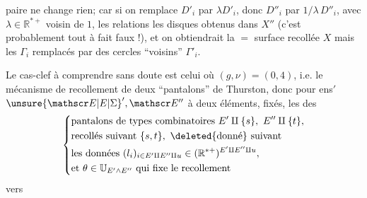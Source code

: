 paire ne change rien; car si on remplace $D'_i$ par $\lambda D'_i$, donc $D''_i$ par $1/\lambda\,D''_i$, avec $\lambda\in\mathbb R^{*+}$ voisin de $1$, les  relations   les disques obtenus dans  $X''$ (c'est probablement tout à fait faux !), et on obtiendrait la $=$ surface recollée $X$ mais les $\Gamma_i$ remplacés par des cercles ``voisins'' $\Gamma'_i$.

Le cas-clef à comprendre sans doute est celui où $(g,\nu)=(0,4)$, i.e. le mécanisme de recollement de deux ``pantalons'' de Thurston, donc pour   ens$'$ $\unsure{\mathscr E|E|\Sigma}',\mathscr E''$ à deux éléments, fixés, les  des
\[
\left\{\begin{aligned}
&\text{pantalons de types combinatoires } E'\amalg\{s\},\ E''\amalg\{t\},\\
&\text{recollés suivant } \{s,t\},\ \text{\deleted{donné} suivant}\\
&\text{les données }(l_i)_{i\in E'\amalg E''\amalg u}\in(\mathbb R^{*+})^{E'\amalg E''\amalg u},\\
&\text{et }\theta\in\mathbb U_{E'\wedge E''}\text{ qui fixe le recollement}
\end{aligned}\right.
\]
vers
